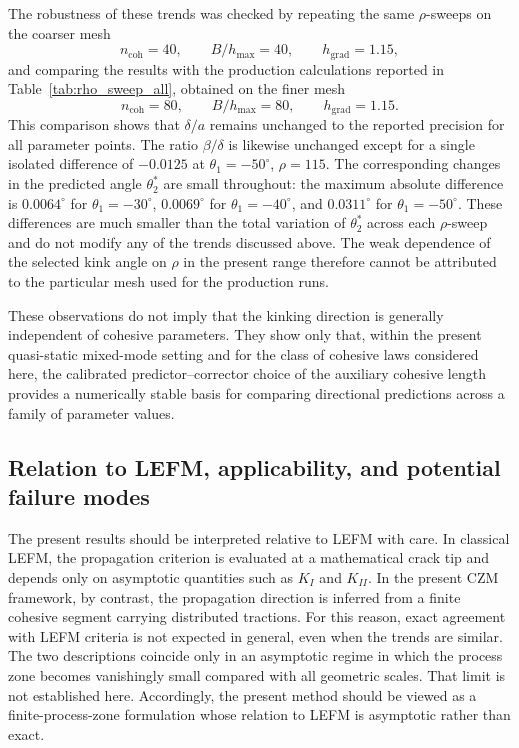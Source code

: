 \documentclass[smallextended]{svjour3}       %
\begin{document}
The robustness of these trends was checked by repeating the same
\(\rho\)-sweeps on the coarser mesh
\[
n_{\mathrm{coh}}=40,\qquad B/h_{\max}=40,\qquad h_{\mathrm{grad}}=1.15,
\]
and comparing the results with the production calculations reported in
Table~\ref{tab:rho_sweep_all}, obtained on the finer mesh
\[
n_{\mathrm{coh}}=80,\qquad B/h_{\max}=80,\qquad h_{\mathrm{grad}}=1.15.
\]
This comparison shows that \(\delta/a\) remains unchanged to the reported
precision for all parameter points. The ratio \(\beta/\delta\) is likewise
unchanged except for a single isolated difference of \(-0.0125\) at
\(\theta_1=-50^\circ\), \(\rho=115\). The corresponding changes in the
predicted angle \(\theta_2^\ast\) are small throughout: the maximum absolute
difference is \(0.0064^\circ\) for \(\theta_1=-30^\circ\),
\(0.0069^\circ\) for \(\theta_1=-40^\circ\), and \(0.0311^\circ\) for
\(\theta_1=-50^\circ\). These differences are much smaller than the total
variation of \(\theta_2^\ast\) across each \(\rho\)-sweep and do not modify
any of the trends discussed above. The weak dependence of the selected kink
angle on \(\rho\) in the present range therefore cannot be attributed to the
particular mesh used for the production runs.

These observations do not imply that the kinking direction is generally
independent of cohesive parameters. They show only that, within the present
quasi-static mixed-mode setting and for the class of cohesive laws considered
here, the calibrated predictor--corrector choice of the auxiliary cohesive
length provides a numerically stable basis for comparing directional
predictions across a family of parameter values.




\subsection{Relation to LEFM, applicability, and potential failure modes}
\label{subsec:scope_failure_modes}

The present results should be interpreted relative to LEFM with care. In
classical LEFM, the propagation criterion is evaluated at a mathematical crack
tip and depends only on asymptotic quantities such as $K_I$ and $K_{II}$. In
the present CZM framework, by contrast, the propagation direction is inferred
from a finite cohesive segment carrying distributed tractions. For this
reason, exact agreement with LEFM criteria is not expected in general, even
when the trends are similar. The two descriptions coincide only in an
asymptotic regime in which the process zone becomes vanishingly small
compared with all geometric scales. That limit is not established here.
Accordingly, the present method should be viewed as a finite-process-zone
formulation whose relation to LEFM is asymptotic rather than exact.
\end{document}
